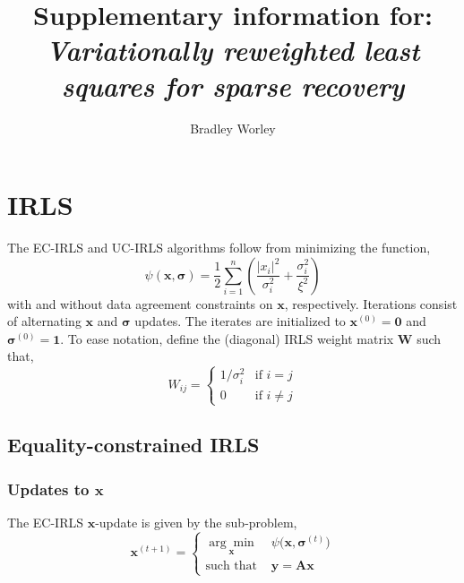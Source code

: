 \documentclass{article}
\newcommand{\m}[1]{\boldsymbol{#1}}
\begin{document}
\author{Bradley Worley}
\title{Supplementary information for: \\
\emph{\Large Variationally reweighted least squares for sparse recovery}}

\maketitle

\section{IRLS}
\label{s:irls}
The EC-IRLS and UC-IRLS algorithms follow from minimizing the function,
\begin{equation}
\psi(\m{x}, \m{\sigma}) =
 \frac{1}{2} \sum_{i=1}^n \left(
  \frac{|x_i|^2}{\sigma_i^2} + \frac{\sigma_i^2}{\xi^2}
 \right)
\label{eq:psi}
\end{equation}
with and without data agreement constraints on $\m{x}$, respectively.
Iterations consist of alternating $\m{x}$ and $\m{\sigma}$ updates.
The iterates are initialized to $\m{x}^{(0)} = \m{0}$ and
$\m{\sigma}^{(0)} = \m{1}$. To ease notation, define
the (diagonal) IRLS weight matrix $\m{W}$ such that,
\begin{equation}
W_{ij} = \begin{cases}
 1 / \sigma_i^2 &\text{if } i = j \\
 0 &\text{if } i \ne j
\end{cases}
\label{eq:wmatrix}
\end{equation}

\subsection{Equality-constrained IRLS}
\subsubsection{Updates to $\m{x}$}
The EC-IRLS $\m{x}$-update is given by the sub-problem,
\begin{equation}
\m{x}^{(t+1)} =
\left\{
\begin{aligned}
 \underset{\m{x}}{\arg\min} &\;
 \psi\big( \m{x}, \m{\sigma}^{(t)} \big)
\\
 \text{such that} &\; \m{y} = \m{A} \m{x}
\end{aligned}
\right.
\label{prob:ec_irls_x}
\end{equation}
\end{document}
